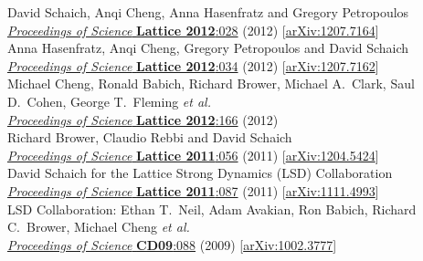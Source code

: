 \begin{spacelist}
\begin{revnumerate}
      David Schaich, Anqi Cheng, Anna Hasenfratz and Gregory Petropoulos \\
      \href{https://doi.org/10.22323/1.164.0028}{\textit{Proceedings of Science} \textbf{Lattice 2012}:028} (2012) [\href{http://arxiv.org/abs/1207.7164}{arXiv:1207.7164}]
    \pagebreakitem
       \\
      Anna Hasenfratz, Anqi Cheng, Gregory Petropoulos and David Schaich \\
      \href{https://doi.org/10.22323/1.164.0034}{\textit{Proceedings of Science} \textbf{Lattice 2012}:034} (2012) [\href{http://arxiv.org/abs/1207.7162}{arXiv:1207.7162}]
    \pagebreakitem
       \\
      Michael Cheng, Ronald Babich, Richard Brower, Michael A.~Clark, Saul D.~Cohen, George T.~Fleming \textit{et al.} \\
      \href{https://doi.org/10.22323/1.164.0166}{\textit{Proceedings of Science} \textbf{Lattice 2012}:166} (2012)
    \pagebreakitem
       \\
      Richard Brower, Claudio Rebbi and David Schaich \\
      \href{https://doi.org/10.22323/1.139.0056}{\textit{Proceedings of Science} \textbf{Lattice 2011}:056} (2011) [\href{http://arxiv.org/abs/1204.5424}{arXiv:1204.5424}]
    \pagebreakitem
       \\
      David Schaich for the Lattice Strong Dynamics (LSD) Collaboration \\
      \href{https://doi.org/10.22323/1.139.0087}{\textit{Proceedings of Science} \textbf{Lattice 2011}:087} (2011) [\href{http://arxiv.org/abs/1111.4993}{arXiv:1111.4993}]
    \pagebreakitem
       \\
      LSD Collaboration: Ethan T.~Neil, Adam Avakian, Ron Babich, Richard C.~Brower, Michael Cheng \textit{et al.} \\ %
      \href{https://doi.org/10.22323/1.086.0088}{\textit{Proceedings of Science} \textbf{CD09}:088} (2009) [\href{http://arxiv.org/abs/1002.3777}{arXiv:1002.3777}]
    \pagebreakitem
       \\

\end{revnumerate}
\end{spacelist}
